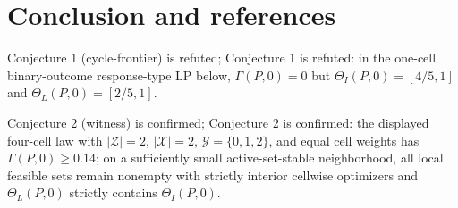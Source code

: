 \documentclass[11pt]{article}
\theoremstyle{definition}
\theoremstyle{plain}
\theoremstyle{remark}
\begin{document}
\section{Conclusion and references}
Conjecture 1 (cycle-frontier) is refuted; Conjecture 1 is refuted: in the one-cell binary-outcome response-type LP below, \(\Gamma(P,0)=0\) but \(\Theta_I(P,0)=[4/5,1]\) and \(\Theta_L(P,0)=[2/5,1]\).

Conjecture 2 (witness) is confirmed; Conjecture 2 is confirmed: the displayed four-cell law with \(|\mathcal Z|=2\), \(|\mathcal X|=2\), \(\mathcal Y=\{0,1,2\}\), and equal cell weights has \(\Gamma(P,0)\ge 0.14\); on a sufficiently small active-set-stable neighborhood, all local feasible sets remain nonempty with strictly interior cellwise optimizers and \(\Theta_L(P,0)\) strictly contains \(\Theta_I(P,0)\).
\end{document}

